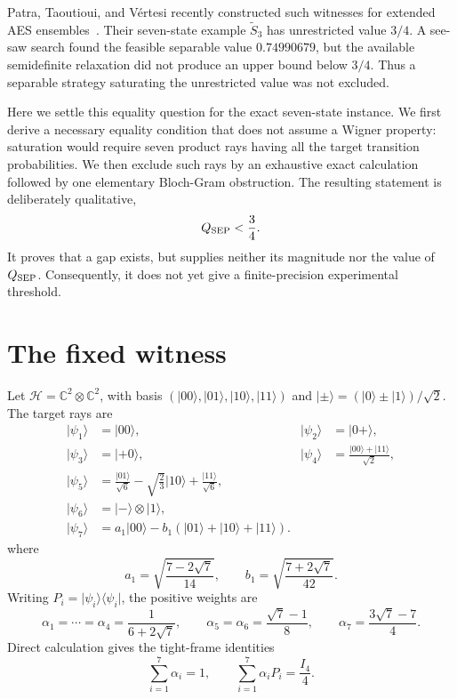 \documentclass[11pt]{article}
\newcommand{\Hil}{\mathcal H}
\newcommand{\ket}[1]{\lvert #1\rangle}
\newcommand{\bra}[1]{\langle #1\rvert}
\newcommand{\proj}[1]{\ket{#1}\!\bra{#1}}
\begin{document}
Patra, Taoutioui, and V\'ertesi recently constructed such witnesses for
extended AES ensembles~\cite{Patra2026}.  Their seven-state example
$\widetilde S_3$ has unrestricted value $3/4$.  A see-saw search found the
feasible separable value $0.74990679$, but the available semidefinite
relaxation did not produce an upper bound below $3/4$.  Thus a separable
strategy saturating the unrestricted value was not excluded.

Here we settle this equality question for the exact seven-state instance.  We
first derive a necessary equality condition that does not assume a Wigner
property: saturation would require seven product rays having all the target
transition probabilities.  We then exclude such rays by an exhaustive exact
calculation followed by one elementary Bloch-Gram obstruction.  The resulting
statement is deliberately qualitative,
\begin{equation}
  Q_{\rm SEP}<\frac34.                                      \label{eq:main}
\end{equation}
It proves that a gap exists, but supplies neither its magnitude nor the value
of $Q_{\rm SEP}$.  Consequently, it does not yet give a finite-precision
experimental threshold.

\section{The fixed witness}
\label{sec:model}

Let $\Hil=\mathbb C^2\otimes\mathbb C^2$, with basis
$(\ket{00},\ket{01},\ket{10},\ket{11})$ and
$\ket{\pm}=(\ket0\pm\ket1)/\sqrt2$.  The target rays are
\begin{align}
 \ket{\psi_1}&=\ket{00},&
 \ket{\psi_2}&=\ket{0+},\nonumber\\
 \ket{\psi_3}&=\ket{+0},&
 \ket{\psi_4}&=\frac{\ket{00}+\ket{11}}{\sqrt2},
                                                        \label{eq:firstfour}\\
 \ket{\psi_5}&=\frac{\ket{01}}{\sqrt6}
             -\sqrt{\frac23}\ket{10}+\frac{\ket{11}}{\sqrt6},\nonumber\\
 \ket{\psi_6}&=\ket-\otimes\ket1,\nonumber\\
 \ket{\psi_7}&=a_1\ket{00}-b_1(\ket{01}+\ket{10}+\ket{11}).
                                                        \label{eq:lastthree}
\end{align}
where
\begin{equation}
 a_1=\sqrt{\frac{7-2\sqrt7}{14}},\qquad
 b_1=\sqrt{\frac{7+2\sqrt7}{42}}.                       \label{eq:ab}
\end{equation}
Writing $P_i=\proj{\psi_i}$, the positive weights are
\begin{equation}
 \alpha_1=\cdots=\alpha_4=\frac1{6+2\sqrt7},\qquad
 \alpha_5=\alpha_6=\frac{\sqrt7-1}{8},\qquad
 \alpha_7=\frac{3\sqrt7-7}{4}.                          \label{eq:weights}
\end{equation}
Direct calculation gives the tight-frame identities
\begin{equation}
  \sum_{i=1}^7\alpha_i=1,
  \qquad \sum_{i=1}^7\alpha_iP_i=\frac{I_4}{4}.          \label{eq:frame}
\end{equation}
\end{document}
